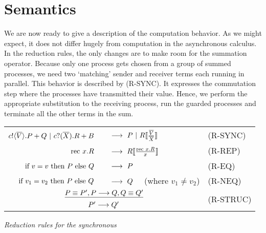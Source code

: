 \section{Semantics}
We are now ready to give a description of the computation behavior.  
As we might expect, it does not differ hugely from computation in the asynchronous calculus.  
In the reduction rules, the only changes are to make room for the summation operator.
Because only one process gets chosen from a group of summed processes, we need two `matching' sender and receiver terms each running in parallel.  This behavior is described by (R-SYNC).  
It expresses the commutation step where the processes have transmitted their value.  Hence, we perform the appropriate substitution to the receiving process, run the guarded processes and terminate all the other terms in the sum.
\begin{insettable}
\begin{center}\begin{tabular}{rll}
	${c}!\langle{ \ensuremath{\overline{V}} }\rangle. P + Q \ |\  {c}?({\overline{X}}).R + B$\ &\  $\pred\  P \comp R\subst{\tuple{V}}{\tuple{X}}$ & \tiny{(R-SYNC)}\\
	$\text{rec }{x}.R$\ &\  $\pred\  R\subst{\rec{x}R}{x}$ & \tiny{(R-REP)}\\
	$\text{if } {v = v}\text{ then } P \text{ else } Q$\ &\ $\pred\ P$ & \tiny{(R-EQ)}\\
	$\text{if } {v_1 = v_2}\text{ then } P \text{ else } Q$\ &\ $\pred\ Q$ \ \ (where $v_1\neq v_2$)& \tiny{(R-NEQ)}\\
	\multicolumn{2}{c}{\hspace{4.5em}$\underline{P\equiv P', P \longrightarrow Q, Q\equiv Q'}$} & \multirow{2}{*}{\tiny{(R-STRUC)}}\\
	\multicolumn{2}{c}{\hspace{4.5em}$P'\longrightarrow Q'$}
\end{tabular}
\caption{\emph{Reduction rules for the synchronous \picalc}}\label{spireducs}
\end{center}
\end{insettable}


